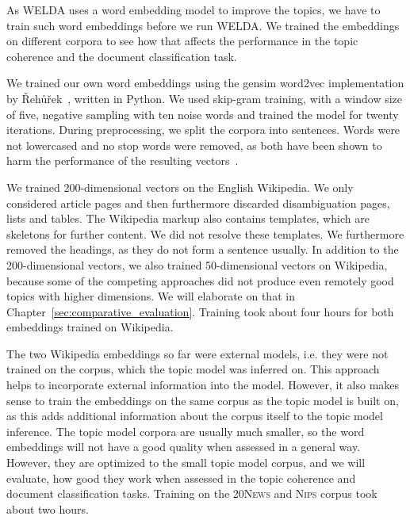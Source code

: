 \documentclass[
        a4paper,
        titlepage,
        twoside,
        parskip
        ]{scrbook}
\theoremstyle{break}
\begin{document}
As WELDA uses a word embedding model to improve the topics, we have to train such word embeddings before we run WELDA.
We trained the embeddings on different corpora to see how that affects the performance in the topic coherence and the document classification task.

We trained our own word embeddings using the gensim word2vec implementation by {\v R}eh{\r u}{\v r}ek~\cite{Rehurek2010}, written in Python.
We used skip-gram training, with a window size of five, negative sampling with ten noise words and trained the model for twenty iterations.
During preprocessing, we split the corpora into sentences.
Words were not lowercased and no stop words were removed, as both have been shown to harm the performance of the resulting vectors~\cite{Mikolov2013d}.

We trained 200-dimensional vectors on the English Wikipedia.
We only considered article pages and then furthermore discarded disambiguation pages, lists and tables.
The Wikipedia markup also contains templates, which are skeletons for further content.
We did not resolve these templates.
We furthermore removed the headings, as they do not form a sentence usually.
In addition to the 200-dimensional vectors, we also trained 50-dimensional vectors on Wikipedia, because some of the competing approaches did not produce even remotely good topics with higher dimensions.
We will elaborate on that in Chapter~\ref{sec:comparative_evaluation}.
Training took about four hours for both embeddings trained on Wikipedia.

The two Wikipedia embeddings so far were external models, i.e. they were not trained on the corpus, which the topic model was inferred on.
This approach helps to incorporate external information into the model.
However, it also makes sense to train the embeddings on the same corpus as the topic model is built on, as this adds additional information about the corpus itself to the topic model inference.
The topic model corpora are usually much smaller, so the word embeddings will not have a good quality when assessed in a general way.
However, they are optimized to the small topic model corpus, and we will evaluate, how good they work when assessed in the topic coherence and document classification tasks.
Training on the \textsc{20News} and \textsc{Nips} corpus took about two hours.
\end{document}

